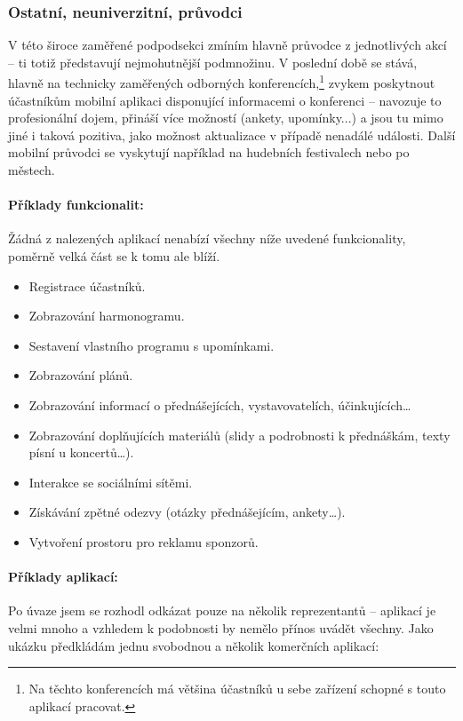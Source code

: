 \subsubsection{Ostatní, neuniverzitní, průvodci}
V této široce zaměřené podpodsekci zmíním hlavně průvodce z jednotlivých akcí -- ti totiž představují nejmohutnější podmnožinu. V poslední době se stává, hlavně na technicky zaměřených odborných konferencích,\footnote{Na těchto konferencích má většina účastníků u sebe zařízení schopné s touto aplikací pracovat.} zvykem poskytnout účastníkům mobilní aplikaci disponující informacemi o konferenci -- navozuje to profesionální dojem, přináší více možností (ankety, upomínky...) a jsou tu mimo jiné i taková pozitiva, jako možnost aktualizace v případě nenadálé události. Další mobilní průvodci se vyskytují například na hudebních festivalech nebo po městech.

\paragraph{Příklady funkcionalit:}
Žádná z nalezených aplikací nenabízí všechny níže uvedené funkcionality, poměrně velká část se k tomu ale blíží.
\begin{itemize}
\item Registrace účastníků.
\item Zobrazování harmonogramu.
\item Sestavení vlastního programu s upomínkami.
\item Zobrazování plánů.
\item Zobrazování informací o přednášejících, vystavovatelích, účinkujících\dots
\item Zobrazování doplňujících materiálů (slidy a podrobnosti k přednáškám, texty písní u koncertů\dots).
\item Interakce se sociálními sítěmi.
\item Získávání zpětné odezvy (otázky přednášejícím, ankety\dots).
\item Vytvoření prostoru pro reklamu sponzorů. 
\end{itemize}

\paragraph{Příklady aplikací:}
Po úvaze jsem se rozhodl odkázat pouze na několik reprezentantů -- aplikací je velmi mnoho a vzhledem k podobnosti by nemělo přínos uvádět všechny. Jako ukázku předkládám jednu svobodnou a několik komerčních aplikací:

